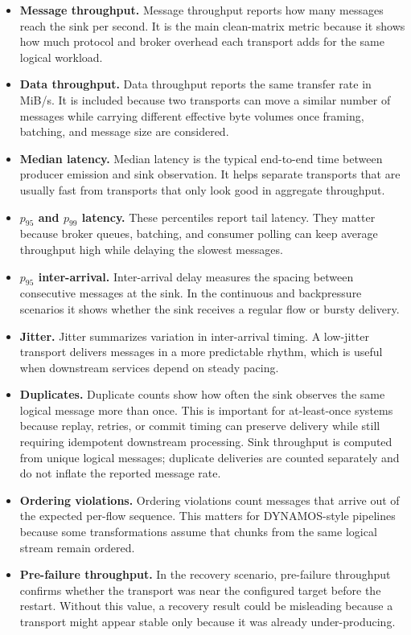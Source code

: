 \begin{itemize}
    \item \textbf{Message throughput.} Message throughput reports how many messages reach the sink per second. It is the main clean-matrix metric because it shows how much protocol and broker overhead each transport adds for the same logical workload.
    \item \textbf{Data throughput.} Data throughput reports the same transfer rate in MiB/s. It is included because two transports can move a similar number of messages while carrying different effective byte volumes once framing, batching, and message size are considered.
    \item \textbf{Median latency.} Median latency is the typical end-to-end time between producer emission and sink observation. It helps separate transports that are usually fast from transports that only look good in aggregate throughput.
    \item \textbf{$p_{95}$ and $p_{99}$ latency.} These percentiles report tail latency. They matter because broker queues, batching, and consumer polling can keep average throughput high while delaying the slowest messages.
    \item \textbf{$p_{95}$ inter-arrival.} Inter-arrival delay measures the spacing between consecutive messages at the sink. In the continuous and backpressure scenarios it shows whether the sink receives a regular flow or bursty delivery.
    \item \textbf{Jitter.} Jitter summarizes variation in inter-arrival timing. A low-jitter transport delivers messages in a more predictable rhythm, which is useful when downstream services depend on steady pacing.
    \item \textbf{Duplicates.} Duplicate counts show how often the sink observes the same logical message more than once. This is important for at-least-once systems because replay, retries, or commit timing can preserve delivery while still requiring idempotent downstream processing. Sink throughput is computed from unique logical messages; duplicate deliveries are counted separately and do not inflate the reported message rate.
    \item \textbf{Ordering violations.} Ordering violations count messages that arrive out of the expected per-flow sequence. This matters for DYNAMOS-style pipelines because some transformations assume that chunks from the same logical stream remain ordered.
    \item \textbf{Pre-failure throughput.} In the recovery scenario, pre-failure throughput confirms whether the transport was near the configured target before the restart. Without this value, a recovery result could be misleading because a transport might appear stable only because it was already under-producing.

\end{itemize}
